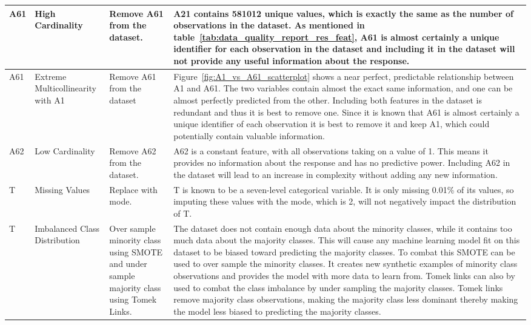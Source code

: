 \documentclass[11pt]{report}
\begin{document}
\begin{longtable}{p{2cm}p{3cm}p{4cm}p{6cm}}
\midrule
A61 & High Cardinality & Remove A61 from the dataset. & A21 contains 581012 unique values, which is exactly the same as the number of observations in the dataset. As mentioned in table~\ref{tab:data_quality_report_res_feat}, A61 is almost certainly a unique identifier for each observation in the dataset and including it in the dataset will not provide any useful information about the response. \\
\midrule
A61 & Extreme Multicollinearity with A1 & Remove A61 from the dataset & Figure~\ref{fig:A1_vs_A61_scatterplot} shows a near perfect, predictable relationship between A1 and A61. The two variables contain almost the exact same information, and one can be almost perfectly predicted from the other. Including both features in the dataset is redundant and thus it is best to remove one. Since it is known that A61 is almost certainly a unique identifier of each observation it is best to remove it and keep A1, which could potentially contain valuable information. \\
\midrule
A62 & Low Cardinality & Remove A62 from the dataset. & A62 is a constant feature, with all observations taking on a value of 1. This means it provides no information about the response and has no predictive power. Including A62 in the dataset will lead to an increase in complexity without adding any new information. \\
\midrule
T & Missing Values & Replace with mode. & T is known to be a seven-level categorical variable. It is only missing 0.01\% of its values, so imputing these values with the mode, which is 2, will not negatively impact the distribution of T. \\
\midrule
T & Imbalanced Class Distribution & Over sample minority class using SMOTE and under sample majority class using Tomek Links. & The dataset does not contain enough data about the minority classes, while it contains too much data about the majority classes. This will cause any machine learning model fit on this dataset to be biased toward predicting the majority classes. To combat this SMOTE can be used to over sample the minority classes. It creates new synthetic examples of minority class observations and provides the model with more data to learn from. Tomek links can also by used to combat the class imbalance by under sampling the majority classes. Tomek links remove majority class observations, making the majority class less dominant thereby making the model less biased to predicting the majority classes. \\
\end{longtable}
\end{document}
